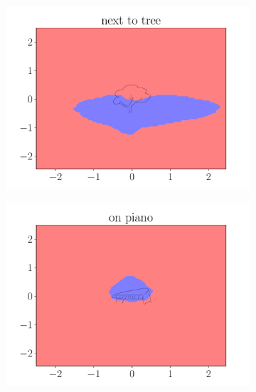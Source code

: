 \begin{figure}[ht]
    \centering
        \begin{subfigure}{0.45\textwidth}
            \centering
            \includegraphics[width=\textwidth]{figures/next_to_tree.pdf}
        \end{subfigure}
        \begin{subfigure}{0.45\textwidth}
            \centering
            \includegraphics[width=\textwidth]{figures/on_piano.pdf}
        \end{subfigure}
        \begin{subfigure}{0.45\textwidth}
            \centering

\end{subfigure}
\end{figure}
